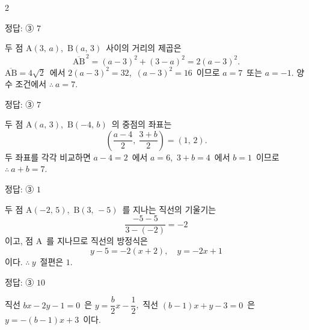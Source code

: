 \documentclass[10pt,fleqn]{article}
\begin{document}
\begin{multicols*}{2}

\begin{dmanswerbox}
정답: ③ $7$
\end{dmanswerbox}

두 점 $\mathrm{A}(3,\,a)$,\ $\mathrm{B}(a,\,3)$\ 사이의 거리의 제곱은
\[ \overline{\mathrm{AB}}^{\,2} = (a-3)^2 + (3-a)^2 = 2(a-3)^2. \]
$\overline{\mathrm{AB}} = 4\sqrt{2}$\ 에서 $2(a-3)^2 = 32$,\ $(a-3)^2 = 16$\ 이므로 $a=7$\ 또는 $a=-1$. 양수 조건에서 $\therefore\ a=7$.

\begin{dmanswerbox}
정답: ③ $7$
\end{dmanswerbox}

두 점 $\mathrm{A}(a,\,3)$,\ $\mathrm{B}(-4,\,b)$\ 의 중점의 좌표는
$$\left( \dfrac{a-4}{2},\ \dfrac{3+b}{2} \right) = (1,\,2).$$
두 좌표를 각각 비교하면 $a-4=2$\ 에서 $a=6$,\ $3+b=4$\ 에서 $b=1$\ 이므로 $\therefore\ a+b=7$.

\begin{dmanswerbox}
정답: ③ $1$
\end{dmanswerbox}

두 점 $\mathrm{A}(-2,\,5)$,\ $\mathrm{B}(3,\,-5)$\ 를 지나는 직선의 기울기는
\[ \dfrac{-5-5}{3-(-2)} = -2 \]
이고, 점 $\mathrm{A}$\ 를 지나므로 직선의 방정식은
\[ y-5 = -2(x+2),\quad y = -2x+1 \]
이다. $\therefore\ y$\ 절편은 $1$.

\begin{dmanswerbox}
정답: ③ $10$
\end{dmanswerbox}

직선 $bx-2y-1=0$\ 은 $y = \dfrac{b}{2}x - \dfrac{1}{2}$,\ 직선 $(b-1)x + y - 3 = 0$\ 은 $y = -(b-1)x + 3$\ 이다.


\end{multicols*}
\end{document}
